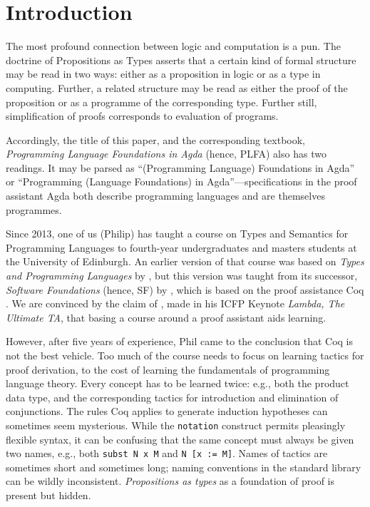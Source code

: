 \documentclass[preprint,authoryear]{elsarticle}
\begin{document}
\maketitle

\section{Introduction}

The most profound connection between logic and computation is a pun.
The doctrine of Propositions as Types asserts that a certain kind of formal
structure may be read in two ways: either as a proposition in logic or
as a type in computing.  Further, a related structure may be read as
either the proof of the proposition or as a programme of the
corresponding type.  Further still, simplification of proofs
corresponds to evaluation of programs.

Accordingly, the title of this paper, and the corresponding textbook,
\emph{Programming Language Foundations in Agda} (hence, PLFA)
also has two readings.  It may be parsed as ``(Programming Language)
Foundations in Agda'' or ``Programming (Language Foundations) in
Agda''---specifications in the proof assistant Agda both describe
programming languages and are themselves programmes.

Since 2013, one of us (Philip) has taught a course on Types and Semantics for
Programming Languages to fourth-year undergraduates and masters
students at the University of Edinburgh.  An earlier version of that
course was based on \emph{Types and Programming Languages} by
\citet{Pierce-2002}, but this version was taught from its successor,
\emph{Software Foundations} (hence, SF) by \citet{Pierce-et-al-2010},
which is based on the proof assistance Coq \citep{Huet-et-al-1997}.
We are convinced by the claim of \citet{Pierce-2009}, made in his ICFP
Keynote \emph{Lambda, The Ultimate TA}, that basing a course around a
proof assistant aids learning.

However, after five years of experience, Phil came to the conclusion
that Coq is not the best vehicle.  Too much of the course needs to
focus on learning tactics for proof derivation, to the cost of
learning the fundamentals of programming language theory.  Every
concept has to be learned twice: e.g., both the product data type, and
the corresponding tactics for introduction and elimination of
conjunctions.  The rules Coq applies to generate induction hypotheses
can sometimes seem mysterious.  While the \texttt{notation} construct
permits pleasingly flexible syntax, it can be confusing that the same
concept must always be given two names, e.g., both
\texttt{subst~N~x~M} and \texttt{N~[x~:=~M]}.  Names of tactics are
sometimes short and sometimes long; naming conventions in the standard
library can be wildly inconsistent.  \emph{Propositions as types} as a
foundation of proof is present but hidden.
\end{document}
